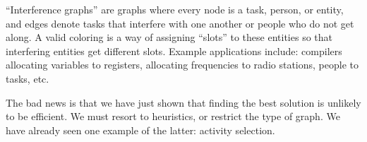 ``Interference graphs'' are graphs where every node is a task, person, or entity, and edges denote tasks that interfere with one another or people who do not get along. A valid coloring is a way of assigning ``slots'' to these entities so that interfering entities get different slots. Example applications include: compilers allocating variables to registers, allocating frequencies to radio stations, people to tasks, etc.

The bad news is that we have just shown that finding the best solution is unlikely to be efficient.  We must resort to heuristics, or restrict the type of graph. We have already seen one example of the latter: activity selection.

































